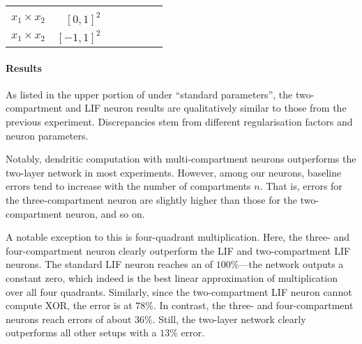 \begin{table}
\begin{tabular}{r r r r r r r }
& \cellcolor{White!80!SteelBlue}{$5.0 \pm 0.4 \%$}
& \cellcolor{White!40!SteelBlue}{$23.1 \pm 1.2 \%$}
& \cellcolor{White!20!SteelBlue}{$25.3 \pm 1.2 \%$}
\\
$x_1 \times x_2$
& $[0, 1]^2$
& \cellcolor{White!20!SteelBlue}{$23.4 \pm 1.0 \%$}
& \cellcolor{White!80!SteelBlue}{$10.2 \pm 0.7 \%$}
& \cellcolor{White!100!SteelBlue}{$\mathbf{5.4 \pm 0.6 \%}$}
& \cellcolor{White!60!SteelBlue}{$11.0 \pm 0.7 \%$}
& \cellcolor{White!40!SteelBlue}{$11.3 \pm 0.9 \%$}
\\
$x_1 \times x_2$
& $[-1, 1]^2$
& \cellcolor{White!20!SteelBlue}{$103.4 \pm 2.1 \%$}
& \cellcolor{White!100!SteelBlue}{$\mathbf{11.4 \pm 1.5 \%}$}
& \cellcolor{White!40!SteelBlue}{$71.3 \pm 4.8 \%$}
& \cellcolor{White!60!SteelBlue}{$20.0 \pm 5.3 \%$}
& \cellcolor{White!80!SteelBlue}{$18.1 \pm 4.1 \%$}
\\
\bottomrule
\end{tabular}
\end{table}

\paragraph{Results}
As listed in the upper portion of  under \enquote{standard parameters}, the two-compartment and LIF neuron results are qualitatively similar to those from the previous experiment.
Discrepancies stem from different regularisation factors and neuron parameters.

Notably, dendritic computation with multi-compartment neurons outperforms the two-layer network in most experiments.
However, among our \nlif neurons, baseline errors tend to increase with the number of compartments $n$.
That is, errors for the three-compartment neuron are slightly higher than those for the two-compartment neuron, and so on.

A notable exception to this is four-quadrant multiplication.
Here, the three- and four-compartment neuron clearly outperform the LIF and two-compartment LIF neurons.
The standard LIF neuron reaches an \NRMSE of $100\%$---the network outputs a constant zero, which indeed is the best linear approximation of multiplication over all four quadrants.
Similarly, since the two-compartment LIF neuron cannot compute XOR, the error is at $78\%$.
In contrast, the three- and four-compartment neurons reach errors of about $36\%$.
Still, the two-layer network clearly outperforms all other setups with a $13\%$ error.


